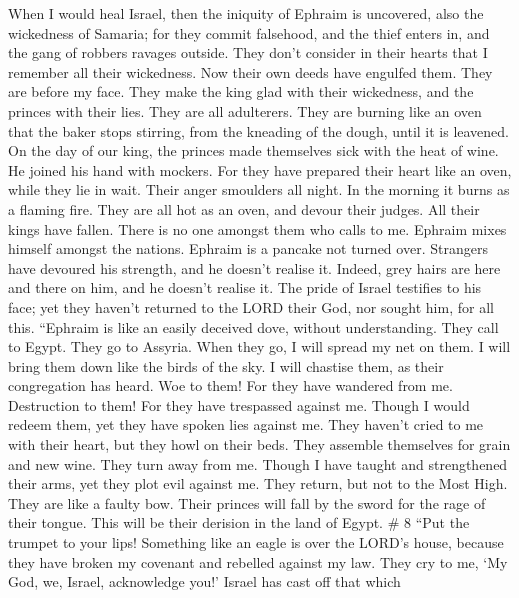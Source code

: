  When I would heal Israel, then the iniquity of Ephraim is
uncovered, also the wickedness of Samaria; for they commit falsehood,
and the thief enters in, and the gang of robbers ravages outside.
 They don't consider in their hearts that I remember all
their wickedness. Now their own deeds have engulfed them. They are
before my face.  They make the king glad with their
wickedness, and the princes with their lies.  They are all
adulterers. They are burning like an oven that the baker stops stirring,
from the kneading of the dough, until it is leavened.  On
the day of our king, the princes made themselves sick with the heat of
wine. He joined his hand with mockers.  For they have
prepared their heart like an oven, while they lie in wait. Their anger
smoulders all night. In the morning it burns as a flaming fire.
 They are all hot as an oven, and devour their judges. All
their kings have fallen. There is no one amongst them who calls to me.
 Ephraim mixes himself amongst the nations. Ephraim is a
pancake not turned over.  Strangers have devoured his
strength, and he doesn't realise it. Indeed, grey hairs are here and
there on him, and he doesn't realise it.  The pride of
Israel testifies to his face; yet they haven't returned to the LORD
their God, nor sought him, for all this.  ``Ephraim is
like an easily deceived dove, without understanding. They call to Egypt.
They go to Assyria.  When they go, I will spread my net
on them. I will bring them down like the birds of the sky. I will
chastise them, as their congregation has heard.  Woe to
them! For they have wandered from me. Destruction to them! For they have
trespassed against me. Though I would redeem them, yet they have spoken
lies against me.  They haven't cried to me with their
heart, but they howl on their beds. They assemble themselves for grain
and new wine. They turn away from me.  Though I have
taught and strengthened their arms, yet they plot evil against me.
 They return, but not to the Most High. They are like a
faulty bow. Their princes will fall by the sword for the rage of their
tongue. This will be their derision in the land of Egypt. \# 8
 ``Put the trumpet to your lips! Something like an eagle
is over the LORD's house, because they have broken my covenant and
rebelled against my law.  They cry to me, `My God, we,
Israel, acknowledge you!'  Israel has cast off that which
